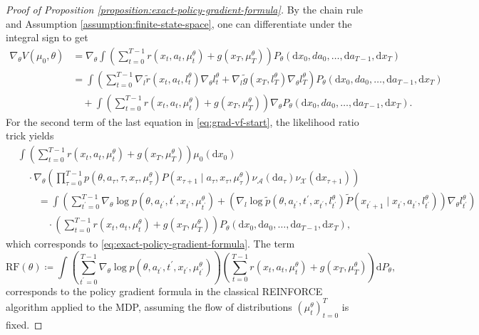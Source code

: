 \documentclass[11pt]{article}
\numberwithin{equation}{section}
\theoremstyle{definition}
\theoremstyle{remark}
\def\cA{\mathcal{A}}
\def\cX{\mathcal{X}}
\def\d{{\mathrm{d}}}
\begin{document}
\begin{proof}[Proof of Proposition \ref{proposition:exact-policy-gradient-formula}]
By the chain rule and Assumption \ref{assumption:finite-state-space}, one can differentiate under the integral sign to get
\begin{equation}
\label{eq:grad-vf-start}
\begin{aligned}
    \nabla_{\theta}V(\mu_0, \theta) &= \nabla_{\theta} \int \left(\sum_{t = 0}^{T - 1} r(x_t, a_t, \mu_t^\theta)  + g(x_T, \mu_T^\theta)\right) P_{\theta} (\d x_0, da_0, \ldots, \d a_{T - 1}, \d x_T) \\
    &= \int \left(\sum_{t = 0}^{T - 1} \nabla_{l} \tilde r(x_t, a_t, l_t^\theta) \nabla_\theta l_t^\theta  + \nabla_{l} \tilde g(x_T, l_T^\theta)\nabla_{\theta}l_T^\theta \right) P_{\theta} (\d x_0, da_0, \ldots, \d a_{T - 1}, \d x_T) \\
    &\quad + \int \left(\sum_{t = 0}^{T - 1} r(x_t, a_t, \mu_t^\theta)  + g(x_T, \mu_T^\theta)\right) \nabla_{\theta} P_{\theta} (\d x_0, da_0, \ldots, \d a_{T - 1}, \d x_T).
\end{aligned}
\end{equation}
For the second term of the last equation in \eqref{eq:grad-vf-start}, the likelihood ratio trick yields
\[
\begin{aligned}
    &\int \left(\sum_{t = 0}^{T - 1} r(x_t, a_t, \mu_t^\theta)  + g(x_T, \mu_T^\theta)\right) \mu_0(\d x_0) \\
    &\quad \cdot \nabla_{\theta} \left(\prod_{\tau = 0}^{T - 1} p (\theta, a_\tau, \tau,x_{\tau}, \mu_\tau^{\theta}) P(x_{\tau + 1} \mid a_{\tau}, x_{\tau},\mu_{\tau}^{\theta}) 
    \nu_{\cA}(\d a_{\tau}) \nu_{\cX} (\d x_{\tau + 1})  \right) \\
    &\qquad= \int  \left( \sum_{t^\prime = 0}^{T - 1} \nabla_{\theta} \log p(\theta, a_{t^\prime},t^\prime,x_{t^\prime},\mu_{t^\prime}^\theta) + \left(\nabla_{l} \log \tilde p(\theta, a_{t^\prime},t^\prime,x_{t^\prime},l_{t^\prime}^\theta) \tilde P(x_{t^\prime + 1} \mid x_{t^\prime},a_{t^\prime}, l_{t^\prime}^\theta) \right) \nabla_{\theta} l_{t^\prime}^\theta \right) \\ 
    &\qquad \quad  \cdot \left(\sum_{t = 0}^{T - 1} r(x_t, a_t, \mu_t^\theta)  + g(x_T, \mu_T^\theta)\right) P_{\theta}(\d x_0, \d a_0, \ldots, \d a_{T - 1}, \d x_T),
\end{aligned}
\]
which corresponds to \eqref{eq:exact-policy-gradient-formula}.
The term
\begin{equation}
    \label{eq:classical-reinforce-term}
    \mathrm{RF}(\theta) \coloneq  \int  \left( \sum_{t^\prime = 0}^{T - 1} \nabla_{\theta} \log p(\theta, a_{t^\prime},t^\prime,x_{t^\prime},\mu_{t^\prime}^\theta) \right)
    \left(\sum_{t = 0}^{T - 1} r(x_t, a_t, \mu_t^\theta)  + g(x_T, \mu_T^\theta)\right) \d P_{\theta},
\end{equation}
corresponds to the policy gradient formula in the classical REINFORCE algorithm applied to the MDP, assuming the flow of distributions $(\mu_t^\theta)_{t = 0}^T$ is fixed.
\end{proof}
\end{document}
